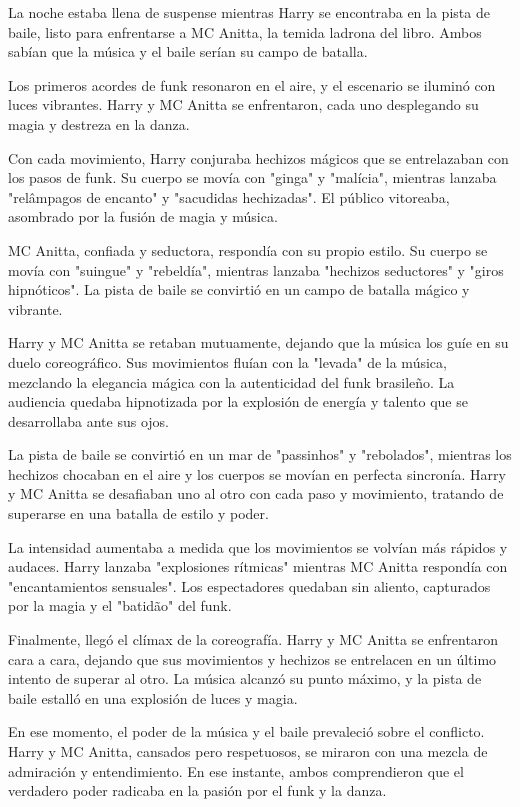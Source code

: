 La noche estaba llena de suspense mientras Harry se encontraba en la pista de baile, listo para enfrentarse a MC Anitta, la temida ladrona del libro. Ambos sabían que la música y el baile serían su campo de batalla.

Los primeros acordes de funk resonaron en el aire, y el escenario se iluminó con luces vibrantes. Harry y MC Anitta se enfrentaron, cada uno desplegando su magia y destreza en la danza.

Con cada movimiento, Harry conjuraba hechizos mágicos que se entrelazaban con los pasos de funk. Su cuerpo se movía con "ginga" y "malícia", mientras lanzaba "relâmpagos de encanto" y "sacudidas hechizadas". El público vitoreaba, asombrado por la fusión de magia y música.

MC Anitta, confiada y seductora, respondía con su propio estilo. Su cuerpo se movía con "suingue" y "rebeldía", mientras lanzaba "hechizos seductores" y "giros hipnóticos". La pista de baile se convirtió en un campo de batalla mágico y vibrante.

Harry y MC Anitta se retaban mutuamente, dejando que la música los guíe en su duelo coreográfico. Sus movimientos fluían con la "levada" de la música, mezclando la elegancia mágica con la autenticidad del funk brasileño. La audiencia quedaba hipnotizada por la explosión de energía y talento que se desarrollaba ante sus ojos.

La pista de baile se convirtió en un mar de "passinhos" y "rebolados", mientras los hechizos chocaban en el aire y los cuerpos se movían en perfecta sincronía. Harry y MC Anitta se desafiaban uno al otro con cada paso y movimiento, tratando de superarse en una batalla de estilo y poder.

La intensidad aumentaba a medida que los movimientos se volvían más rápidos y audaces. Harry lanzaba "explosiones rítmicas" mientras MC Anitta respondía con "encantamientos sensuales". Los espectadores quedaban sin aliento, capturados por la magia y el "batidão" del funk.

Finalmente, llegó el clímax de la coreografía. Harry y MC Anitta se enfrentaron cara a cara, dejando que sus movimientos y hechizos se entrelacen en un último intento de superar al otro. La música alcanzó su punto máximo, y la pista de baile estalló en una explosión de luces y magia.

En ese momento, el poder de la música y el baile prevaleció sobre el conflicto. Harry y MC Anitta, cansados pero respetuosos, se miraron con una mezcla de admiración y entendimiento. En ese instante, ambos comprendieron que el verdadero poder radicaba en la pasión por el funk y la danza.

